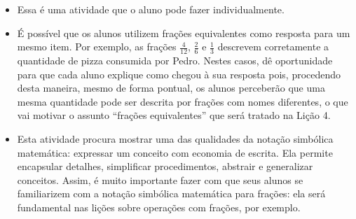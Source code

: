 \begin{orientacoes}
  \begin{itemize} %
    \item       Essa é uma atividade que o aluno pode fazer individualmente.
    \item       É possível que os alunos utilizem frações equivalentes como resposta para um mesmo item. Por exemplo, as frações       $\frac{4}{12}$,       $\frac{2}{6}$ e       $\frac{1}{3}$ descrevem corretamente a quantidade de pizza consumida por Pedro. Nestes casos, dê oportunidade para que cada aluno explique como chegou à sua resposta pois, procedendo desta maneira, mesmo de forma pontual, os alunos perceberão que uma mesma quantidade pode ser descrita por frações com nomes diferentes, o que vai motivar o assunto ``frações equivalentes''     que será tratado na Lição 4.
    \item       Esta atividade procura mostrar uma das qualidades da notação simbólica matemática: expressar um conceito com economia de escrita. Ela permite encapsular detalhes, simplificar procedimentos, abstrair e generalizar conceitos. Assim, é muito importante fazer com que seus alunos se familiarizem com a notação simbólica matemática para frações: ela será fundamental nas lições sobre operações com frações, por exemplo.
\end{itemize} %





%
\end{orientacoes}

